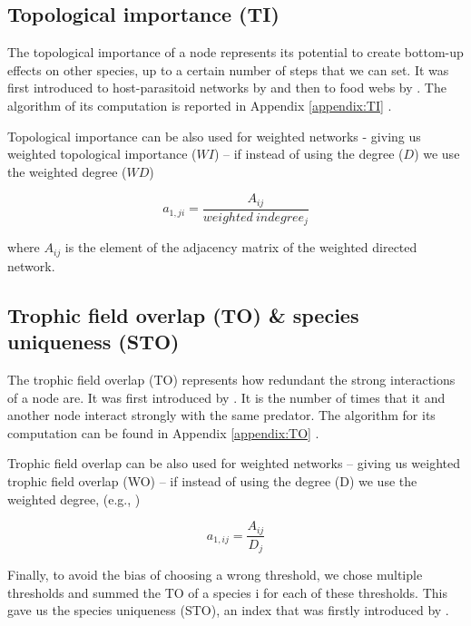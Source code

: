 	\subsection*{Topological importance (TI)}

		The topological importance of a node represents its potential to create bottom-up effects on other species, up to a certain number of steps that we can set. It was first introduced to host-parasitoid networks by \citet{Muller1999} and then to food webs by \citet{Jordan2003}. The algorithm of its computation is reported in Appendix \ref{appendix:TI} \citep{Jordan2009}.



		Topological importance can be also used for weighted networks - giving us weighted topological importance ($WI$) – if instead of using the degree ($D$) we use the weighted degree ($WD$) \citep{Scotti2007}

						\begin{equation}
							a_{1,ji}=\frac{A_{ij}}{weighted\:indegree_j}
						\end{equation}

		\noindent where $A_{ij}$ is the element of the adjacency matrix of the weighted directed network.

	\subsection*{Trophic field overlap (TO) & species uniqueness (STO)}

		The trophic field overlap (TO) represents how redundant the strong interactions of a node are. It was first introduced by \citet{Jordan2009a}. It is the number of times that it and another node interact strongly with the same predator. The algorithm for its computation can be found in Appendix \ref{appendix:TO} \citep{Jordan2018}.


		Trophic field overlap can be also used for weighted networks – giving us weighted trophic field overlap (WO) – if instead of using the degree (D) we use the weighted degree, (e.g., \citet{Xiao2019})

						\begin{equation}
							a_{1,ij}=\frac{A_{ij}}{D_j}
						\end{equation}

		Finally, to avoid the bias of choosing a wrong threshold, we chose multiple thresholds and summed the TO of a species i for each of these thresholds. This gave us the species uniqueness (STO), an index that was firstly introduced by \citet{Lai2015}.

